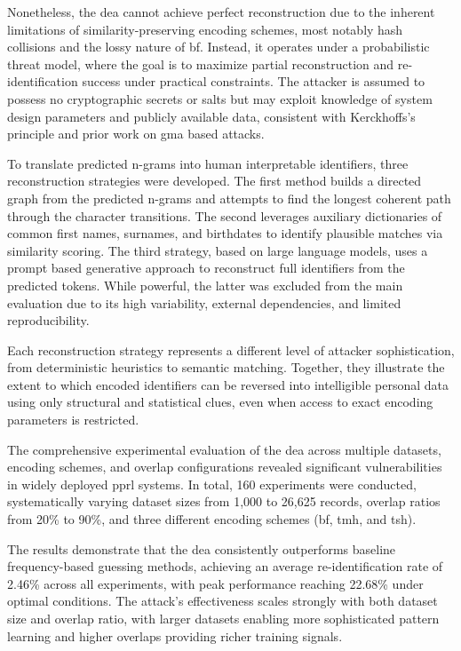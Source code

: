 Nonetheless, the \ac{dea} cannot achieve perfect reconstruction due to the inherent limitations of similarity-preserving encoding schemes, most notably hash collisions and the lossy nature of \ac{bf}.
Instead, it operates under a probabilistic threat model, where the goal is to maximize partial reconstruction and re-identification success under practical constraints.
The attacker is assumed to possess no cryptographic secrets or salts but may exploit knowledge of system design parameters and publicly available data, consistent with Kerckhoffs’s principle and prior work on \ac{gma} based attacks.

To translate predicted n-grams into human interpretable identifiers, three reconstruction strategies were developed.
The first method builds a directed graph from the predicted n-grams and attempts to find the longest coherent path through the character transitions.
The second leverages auxiliary dictionaries of common first names, surnames, and birthdates to identify plausible matches via similarity scoring.
The third strategy, based on large language models, uses a prompt based generative approach to reconstruct full identifiers from the predicted tokens.
While powerful, the latter was excluded from the main evaluation due to its high variability, external dependencies, and limited reproducibility.

Each reconstruction strategy represents a different level of attacker sophistication, from deterministic heuristics to semantic matching.
Together, they illustrate the extent to which encoded identifiers can be reversed into intelligible personal data using only structural and statistical clues, even when access to exact encoding parameters is restricted.

The comprehensive experimental evaluation of the \ac{dea} across multiple datasets, encoding schemes, and overlap configurations revealed significant vulnerabilities in widely deployed \ac{pprl} systems.
In total, 160 experiments were conducted, systematically varying dataset sizes from 1,000 to 26,625 records, overlap ratios from 20\% to 90\%, and three different encoding schemes (\ac{bf}, \ac{tmh}, and \ac{tsh}).

The results demonstrate that the \ac{dea} consistently outperforms baseline frequency-based guessing methods, achieving an average re-identification rate of 2.46\% across all experiments, with peak performance reaching 22.68\% under optimal conditions.
The attack's effectiveness scales strongly with both dataset size and overlap ratio, with larger datasets enabling more sophisticated pattern learning and higher overlaps providing richer training signals.

